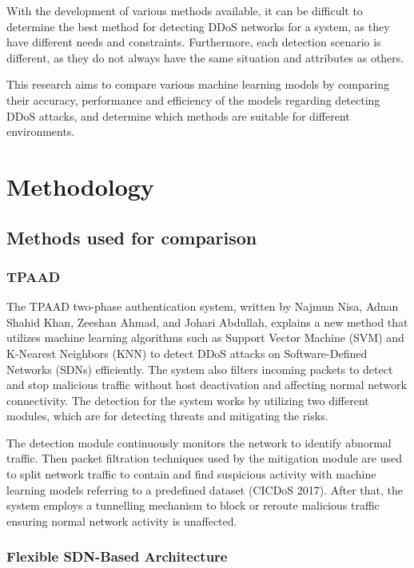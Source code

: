 \documentclass[a4paper, 12pt]{article}
\begin{document}
With the development of various methods available, it can be difficult to determine the best method for detecting DDoS networks for a system, as they have different needs and constraints. Furthermore, each detection scenario is different, as they do not always have the same situation and attributes as others. 

This research aims to compare various machine learning models by comparing their accuracy, performance and efficiency of the models regarding detecting DDoS attacks, and determine which methods are suitable for different environments. 

\section{Methodology}

\subsection{Methods used for comparison}

\subsubsection{TPAAD}
The TPAAD two-phase authentication system, written by Najmun Nisa, Adnan Shahid Khan, Zeeshan Ahmad, and Johari Abdullah, explains a new method that utilizes machine learning algorithms such as Support Vector Machine (SVM) and K-Nearest Neighbors (KNN) to detect DDoS attacks on Software-Defined Networks (SDNs) efficiently. The system also filters incoming packets to detect and stop malicious traffic without host deactivation and affecting normal network connectivity.  The detection for the system works by utilizing two different modules, which are for detecting threats and mitigating the risks. 

The detection module continuously monitors the network to identify abnormal traffic. Then packet filtration techniques used by the mitigation module are used to split network traffic to contain and find suspicious activity with machine learning models referring to a predefined dataset (CICDoS 2017). After that, the system employs a tunnelling mechanism to block or reroute malicious traffic ensuring normal network activity is unaffected. 

\subsubsection{Flexible SDN-Based Architecture}
\end{document}
